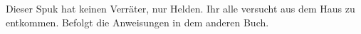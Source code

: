 

Dieser Spuk hat keinen Verräter, nur Helden.
Ihr alle versucht aus dem Haus zu entkommen.
Befolgt die Anweisungen in dem anderen Buch.